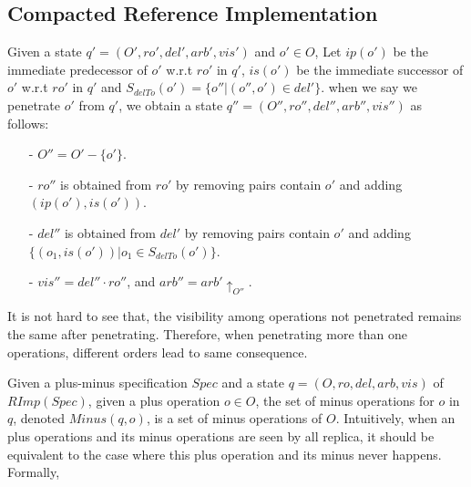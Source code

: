 \subsection{Compacted Reference Implementation}
\label{subsec:compacted reference implementation}

Given a state $q'=(O',ro',del',arb',vis')$ and $o' \in O$, Let $ip(o')$ be the immediate predecessor of $o'$ w.r.t $ro'$ in $q'$, $is(o')$ be the immediate successor of $o'$ w.r.t $ro'$ in $q'$ and $S_{delTo}(o') = \{o'' \vert (o'',o') \in del' \}$. when we say we penetrate $o'$ from $q'$, we obtain a state $q''=(O'',ro'',del'',arb'',vis'')$ as follows:

\begin{itemize}
\setlength{\itemsep}{0.5pt}
\item[-] $O'' = O' - \{ o' \}$.

\item[-] $ro''$ is obtained from $ro'$ by removing pairs contain $o'$ and adding $(ip(o'),is(o'))$.

\item[-] $del''$ is obtained from $del'$ by removing pairs contain $o'$ and adding $\{ (o_1,is(o')) \vert o_1 \in S_{delTo}(o')\}$.

\item[-] $vis'' = del'' \cdot ro''$, and $arb'' = arb' \uparrow_{O''}$.
\end{itemize}

It is not hard to see that, the visibility among operations not penetrated remains the same after penetrating. Therefore, when penetrating more than one operations, different orders lead to same consequence.

Given a plus-minus specification $Spec$ and a state $q=(O,ro,del,arb,vis)$ of $RImp(Spec)$, given a plus operation $o \in O$, the set of minus operations for $o$ in $q$, denoted $Minus(q,o)$, is a set of minus operations of $O$. Intuitively, when an plus operations and its minus operations are seen by all replica, it should be equivalent to the case where this plus operation and its minus never happens. Formally,

